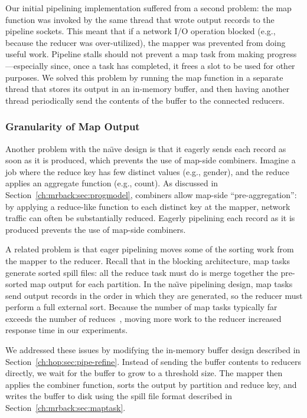Our initial pipelining implementation suffered from a second problem: the map
function was invoked by the same thread that wrote output records to the
pipeline sockets. This meant that if a network I/O operation blocked (e.g.,
because the reducer was over-utilized), the mapper was prevented from doing
useful work. Pipeline stalls should not prevent a map task from making
progress---especially since, once a task has completed, it frees a {\TT} slot
to be used for other purposes. We solved this problem by running the map
function in a separate thread that stores its output in an in-memory buffer, and
then having another thread periodically send the contents of the buffer to the
connected reducers.

\subsubsection{Granularity of Map Output}
\label{ch:hop:sec:mapout}

Another problem with the na\"{\i}ve design is that it eagerly sends
each record as soon as it is produced, which prevents the use of
map-side combiners. Imagine a job where the reduce key has few
distinct values (e.g., gender), and the reduce applies an aggregate
function (e.g., count). As discussed in Section~\ref{ch:mrback:sec:progmodel},
combiners allow map-side ``pre-aggregation'': by applying a
reduce-like function to each distinct key at the mapper, network
traffic can often be substantially reduced. Eagerly pipelining each
record as it is produced prevents the use of map-side combiners.

A related problem is that eager pipelining moves some of the sorting
work from the mapper to the reducer. Recall that in the blocking
architecture, map tasks generate sorted spill files: all the reduce
task must do is merge together the pre-sorted map output for each
partition. In the na\"{\i}ve pipelining design, map tasks send output
records in the order in which they are generated, so the reducer must
perform a full external sort. Because the number of map tasks
typically far exceeds the number of reduces~\cite{mapreduce-osdi},
moving more work to the reducer increased response time in our
experiments.

We addressed these issues by modifying the in-memory buffer design described in
Section~\ref{ch:hop:sec:pipe-refine}. Instead of sending the buffer contents to
reducers directly, we wait for the buffer to grow to a threshold
size. The mapper then applies the combiner function, sorts the output by
partition and reduce key, and writes the buffer to disk using the spill file
format described in Section~\ref{ch:mrback:sec:maptask}.

